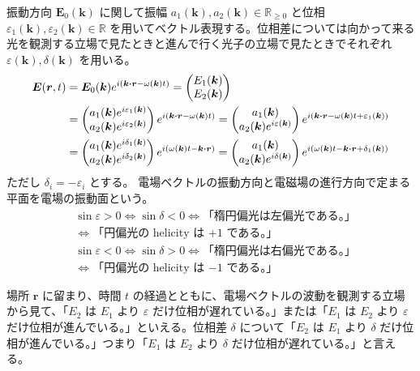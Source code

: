 \documentclass[uplatex,dvipdfmx,a4paper,11pt]{jlreq}
\newcommand{\RR}{\mathbb{R}}
\newcommand{\EE}{\bm{E}}
\newcommand{\rr}{\bm{r}}
\newcommand{\kk}{\bm{k}}
\theoremstyle{definition}
\begin{document}
\begin{definition}[偏光]
  振動方向 $\EE_0(\kk)$ に関して振幅 $a_1(\kk), a_2(\kk)\in\RR_{\geq 0}$ と位相 $\varepsilon_1(\kk), \varepsilon_2(\kk)\in\RR$ を用いてベクトル表現する。位相差については向かって来る光を観測する立場で見たときと進んで行く光子の立場で見たときでそれぞれ $\varepsilon(\kk), \delta(\kk)$ を用いる。
  \begin{align}
    \EE(\rr, t) & = \EE_0(\kk)e^{i(\kk\vdot\rr - \omega(\kk)t)}
    = \begin{pmatrix}
        E_1(\kk) \\
        E_2(\kk)
      \end{pmatrix}                                                    \\
                & = \begin{pmatrix}
                      a_1(\kk)e^{i\varepsilon_1(\kk)} \\
                      a_2(\kk)e^{i\varepsilon_2(\kk)}
                    \end{pmatrix}e^{i(\kk\vdot\rr - \omega(\kk)t)}
    =
    \begin{pmatrix}
      a_1(\kk) \\
      a_2(\kk)e^{i\varepsilon(\kk)}
    \end{pmatrix}e^{i(\kk\vdot\rr - \omega(\kk)t + \varepsilon_1(\kk))} \\
                & =
    \begin{pmatrix}
      a_1(\kk)e^{i\delta_1(\kk)} \\
      a_2(\kk)e^{i\delta_2(\kk)}
    \end{pmatrix}e^{i(\omega(\kk)t - \kk\vdot\rr)}
    =
    \begin{pmatrix}
      a_1(\kk) \\
      a_2(\kk)e^{i\delta(\kk)}
    \end{pmatrix}e^{i(\omega(\kk)t - \kk\vdot\rr + \delta_1(\kk))}
  \end{align}
  ただし $\delta_i = - \varepsilon_i$ とする。
  電場ベクトルの振動方向と電磁場の進行方向で定まる平面を電場の振動面という。
  \begin{align}
     & \sin\varepsilon > 0 \iff \sin\delta < 0 \iff \text{「楕円偏光は左偏光である。」} \\
     & \iff \text{「円偏光の helicity は $+1$ である。」}                            \\
     & \sin\varepsilon < 0 \iff \sin\delta > 0 \iff \text{「楕円偏光は右偏光である。」} \\
     & \iff \text{「円偏光の helicity は $-1$ である。」}
  \end{align}
\end{definition}
\begin{proposition}
  場所 $\rr$ に留まり、時間 $t$ の経過とともに、電場ベクトルの波動を観測する立場から見て、「$E_2$ は $E_1$ より $\varepsilon$ だけ位相が遅れている。」または「$E_1$ は $E_2$ より $\varepsilon$ だけ位相が進んでいる。」といえる。位相差 $\delta$ について「$E_2$ は $E_1$ より $\delta$ だけ位相が進んでいる。」つまり「$E_1$ は $E_2$ より $\delta$ だけ位相が遅れている。」と言える。
\end{proposition}
\end{document}

